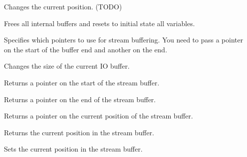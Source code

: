 

Changes the current position. (TODO)



Frees all internal buffers and resets to initial state all variables.



Specifies which pointers to use for stream buffering. You need to pass a pointer on the
start of the buffer end and another on the end.



Changes the size of the current IO buffer.



Returns a pointer on the start of the stream buffer.



Returns a pointer on the end of the stream buffer.



Returns a pointer on the current position of the stream buffer.



Returns the current position in the stream buffer.



Sets the current position in the stream buffer.



